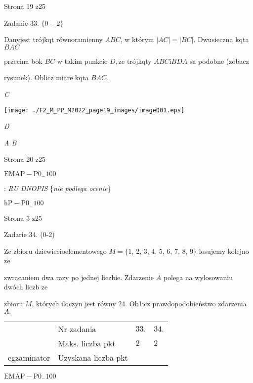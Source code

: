 \documentclass[a4paper,12pt]{article}
\begin{document}
Strona 19 z25





Zadanie 33. $\{0-2\}$

Danyjest trójkqt równoramienny $ABC$, w którym $|AC|=|BC|$. Dwusieczna kqta $BAC$

przecina bok $BC$ w takim punkcie $D, \dot{\mathrm{z}}\mathrm{e}$ trójkqty $ABC \mathrm{i} BDA$ sa podobne (zobacz

rysunek). Oblicz miare kqta $BAC.$

{\it C}
\begin{center}
\texttt{[image: ./F2\_M\_PP\_M2022\_page19\_images/image001.eps]}
\end{center}
{\it D}

{\it A B}

Strona 20 z25

$\mathrm{E}\mathrm{M}\mathrm{A}\mathrm{P}-\mathrm{P}0_{-}100$





: {\it RU DNOPIS} \{{\it nie podlega ocenie}\}

$\mathrm{h}\mathrm{P}-\mathrm{P}0_{-}100$

Strona 3 z25





Zadarie 34. (0-2)

Ze zbioru dziewiecioelementowego $M=\{1$, 2, 3, 4, 5, 6, 7, 8, 9$\}$ losujemy kolejno ze

zwracaniem dwa razy po jednej liczbie. Zdarzenie $A$ polega na wylosowaniu dwóch liczb ze

zbioru $M$, których iloczyn jest równy 24. Ob1icz prawdopodobieństwo zdarzenia $A.$
\begin{center}
\begin{tabular}{|l|l|l|l|}
\cline{2-4}
&	\multicolumn{1}{|l|}{Nr zadania}&	\multicolumn{1}{|l|}{$33.$}&	\multicolumn{1}{|l|}{ $34.$}	\\
\cline{2-4}
&	\multicolumn{1}{|l|}{Maks. liczba pkt}&	\multicolumn{1}{|l|}{$2$}&	\multicolumn{1}{|l|}{ $2$}	\\
\cline{2-4}
\multicolumn{1}{|l|}{egzaminator}&	\multicolumn{1}{|l|}{Uzyskana liczba pkt}&	\multicolumn{1}{|l|}{}&	\multicolumn{1}{|l|}{}	\\
\hline
\end{tabular}

\end{center}
$\mathrm{E}\mathrm{M}\mathrm{A}\mathrm{P}-\mathrm{P}0_{-}100$
\end{document}
